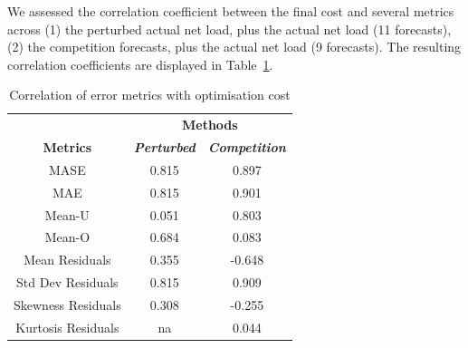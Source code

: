 \documentclass[conference]{IEEEtran}
\begin{document}
We assessed the correlation coefficient between the final cost and several metrics across (1) the perturbed actual net load, plus the actual net load (11 forecasts), (2) the competition forecasts, plus the actual net load (9 forecasts). The resulting correlation coefficients are displayed in Table~\ref{tab:corr_metric_cost}.


\begin{table}[htbp]
\caption{Correlation of error metrics with optimisation cost}
\begin{center}
\begin{tabular}{|c|c|c|}
\hline
\textbf{}&\multicolumn{2}{|c|}{\textbf{Methods}} \\
\cline{2-3} 
\textbf{Metrics} &
\textbf{\textit{Perturbed}}& \textbf{\textit{Competition}} \\ %
\hline
MASE & 0.815 & 0.897  \\
MAE  & 0.815 & 0.901 \\
Mean-U  & 0.051 & 0.803  \\
Mean-O  & 0.684 & 0.083 \\ 
Mean Residuals  & 0.355 & -0.648  \\ 
Std Dev Residuals  & 0.815 & 0.909  \\ 
Skewness Residuals  & 0.308 & -0.255  \\ 
Kurtosis Residuals  & na & 0.044  \\ 
\hline
\end{tabular}
\label{tab:corr_metric_cost}
\end{center}
\end{table}
\end{document}
